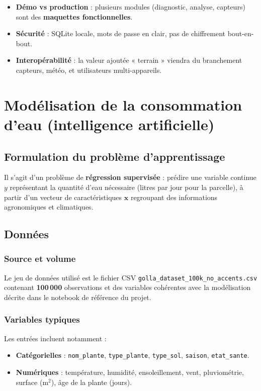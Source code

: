 \documentclass[12pt,a4paper,twoside,openright]{report}
\begin{document}
\begin{itemize}
  \item \textbf{Démo vs production} : plusieurs modules (diagnostic, analyse, capteurs) sont des \textbf{maquettes fonctionnelles}.
  \item \textbf{Sécurité} : SQLite locale, mots de passe en clair, pas de chiffrement bout-en-bout.
  \item \textbf{Interopérabilité} : la valeur ajoutée « terrain » viendra du branchement capteurs, météo, et utilisateurs multi-appareils.
\end{itemize}

\cleardoublepage

\chapter{Modélisation de la consommation d'eau (intelligence artificielle)}

\section{Formulation du problème d'apprentissage}

Il s'agit d'un problème de \textbf{régression supervisée} : prédire une variable continue $y$ représentant la quantité d'eau nécessaire (litres par jour pour la parcelle), à partir d'un vecteur de caractéristiques $\mathbf{x}$ regroupant des informations agronomiques et climatiques.

\section{Données}

\subsection{Source et volume}
Le jeu de données utilisé est le fichier CSV \texttt{golla\_dataset\_100k\_no\_accents.csv} contenant \textbf{100\,000} observations et des variables cohérentes avec la modélisation décrite dans le notebook de référence du projet.

\subsection{Variables typiques}
Les entrées incluent notamment :
\begin{itemize}
  \item \textbf{Catégorielles} : \texttt{nom\_plante}, \texttt{type\_plante}, \texttt{type\_sol}, \texttt{saison}, \texttt{etat\_sante}.
  \item \textbf{Numériques} : température, humidité, ensoleillement, vent, pluviométrie, surface (m$^2$), âge de la plante (jours).
\end{itemize}
\end{document}

